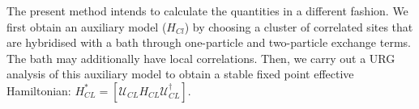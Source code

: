 \documentclass{report}
\numberwithin{equation}{section}
\begin{document}
 The present method intends to calculate the quantities in a different fashion. We first obtain an auxiliary model ($H_{Cl}$) by choosing a cluster of correlated sites that are hybridised with a bath through one-particle and two-particle exchange terms. The bath may additionally have local correlations. Then, we carry out a URG analysis of this auxiliary model to obtain a stable fixed point effective Hamiltonian:  $H^{*}_{CL} = \left[\mathcal{U}_{CL} H_{CL} \mathcal{U}_{CL}^\dagger \right]$.
\end{document}
